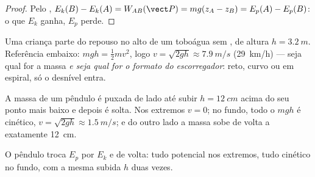 \begin{proof}
Pelo ,
$E_k(B) - E_k(A) = W_{AB}(\vect P) = mg(z_A - z_B) = E_p(A) - E_p(B)$: o
que $E_k$ ganha, $E_p$ perde.
\end{proof}

\begin{example}[Toboágua]\label{ex:g11:mechanical-energy:slide}
Uma criança parte do repouso no alto de um toboágua sem , de altura
$h = \qty{3.2}{m}$. Referência embaixo: $mgh = \tfrac12 mv^2$, logo
$v = \sqrt{2gh} \approx \qty{7.9}{m/s}$ (\qty{29}{km/h}) --- seja qual
for a massa \emph{e seja qual for o formato do escorregador}: reto,
curvo ou em espiral, só o desnível entra.
\end{example}

\begin{example}[Pêndulo]\label{ex:g11:mechanical-energy:pendulum}
A massa de um pêndulo é puxada de lado até subir $h = \qty{12}{cm}$ acima
do seu ponto mais baixo e depois é solta. Nos extremos $v = 0$; no fundo,
todo o $mgh$ é cinético, $v = \sqrt{2gh} \approx \qty{1.5}{m/s}$; e do
outro lado a massa sobe de volta a exatamente \qty{12}{cm}.
\end{example}

\begin{omfigure}

{\small O pêndulo troca $E_p$ por $E_k$ e de volta: tudo potencial nos
extremos, tudo cinético no fundo, com a mesma subida $h$ duas vezes.}
\end{omfigure}

